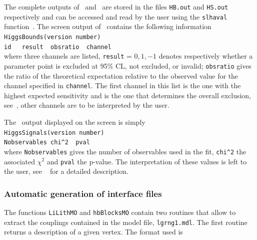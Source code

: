 \documentclass[12pt,a4paper]{article}
\begin{document}
%
The complete outputs of \HB\ and \HS\ are stored in the files  \verb|HB.out| and \verb|HS.out| respectively and can be accessed  and read  by the user using the \verb|slhaval| function~\cite{Belanger:2014hqa}.
The screen output of \micro\ contains the following information\\
 
\noindent
\verb|HiggsBounds(version number)|\\
\verb|id   result  obsratio  channel |\\
 
\noindent
where three channels are listed,  \verb|result| = $0,1,-1$ denotes respectively whether a parameter point is excluded at 95\% CL, not excluded, or invalid; \verb|obsratio| gives the ratio of the theoretical expectation relative to the observed value  for the channel specified in \verb|channel|. The first channel in this list is the one with the highest expected sensitivity and is the one that determines the overall exclusion, see~\cite{Bechtle:2013wla}, other channels are to be interpreted by the user. 


The \HS\ output displayed on the screen is simply \\

\noindent
\verb|HiggsSignals(version number)|\\
\verb|Nobservables chi^2  pval|\\

\noindent
where \verb|Nobservables| gives the number of observables used in the fit, \verb|chi^2| the associated $\chi^2$ and \verb|pval| the p-value. 
The interpretation of these values is left to the user, see ~\cite{Bechtle:2013xfa} for a detailed description.


\subsubsection{Automatic generation of interface files}
\label{sec:auto}

The functions {\tt LiLithMO} and {\tt hbBlocksMO} contain two routines  that allow  to extract the couplings contained in the model file, {\tt lgrng1.mdl}.    
The first routine returns a description of a given vertex. The format used is \\
\end{document}
